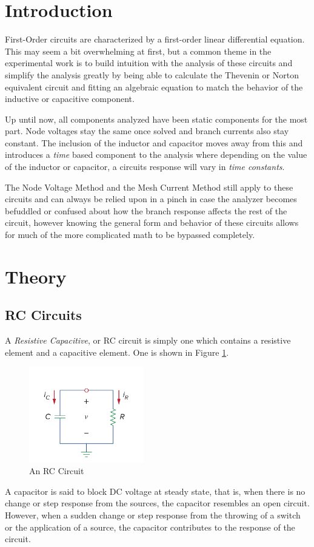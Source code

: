 \documentclass[12pt]{article}
\begin{document}
\section{Introduction}
First-Order circuits are characterized by a first-order linear differential
equation. This may seem a bit overwhelming at first, but a common theme in the
experimental work is to build intuition with the analysis of these circuits
and simplify the analysis greatly by being able to calculate the Thevenin or
Norton equivalent circuit and fitting an algebraic equation to match the
behavior of the inductive or capacitive component.

Up until now, all components analyzed have been static components for the most
part. Node voltages stay the same once solved and branch currents also stay
constant. The inclusion of the inductor and capacitor moves away from this and
introduces a \textit{time} based component to the analysis where depending on
the value of the inductor or capacitor, a circuits response will vary in
\textit{time constants}.

The Node Voltage Method and the Mesh Current Method still apply to these
circuits and can always be relied upon in a pinch in case the analyzer becomes
befuddled or confused about how the branch response affects the rest of the
circuit, however knowing the general form and behavior of these circuits allows
for much of the more complicated math to be bypassed completely.
\section{Theory}
\subsection{RC Circuits}
A \textit{Resistive Capacitive}, or RC circuit is simply one which contains a
resistive element and a capacitive element. One is shown in Figure
\ref{fig:theory1}.
\begin{figure}[H]
	\centering
	\includegraphics[width=5cm]{e5_th1}
	\caption{An RC Circuit}
	\label{fig:theory1}
\end{figure}
A capacitor is said to block DC voltage at steady state, that is, when there is
no change or step response from the sources, the capacitor resembles an open
circuit. However, when a sudden change or step response from the throwing of a
switch or the application of a source, the capacitor contributes to the response
of the circuit. 
\end{document}
